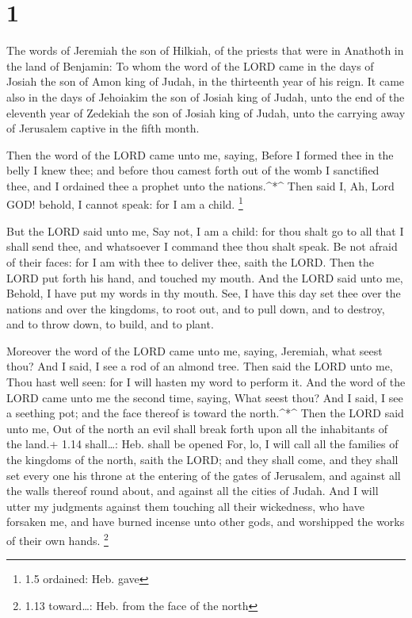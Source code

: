 \hypertarget{section}{%
\section{1}\label{section}}

 The words of Jeremiah the son of Hilkiah, of the priests
that were in Anathoth in the land of Benjamin:  To whom the
word of the LORD came in the days of Josiah the son of Amon king of
Judah, in the thirteenth year of his reign.  It came also in
the days of Jehoiakim the son of Josiah king of Judah, unto the end of
the eleventh year of Zedekiah the son of Josiah king of Judah, unto the
carrying away of Jerusalem captive in the fifth month.

 Then the word of the LORD came unto me, saying,
 Before I formed thee in the belly I knew thee; and before
thou camest forth out of the womb I sanctified thee, and I ordained thee
a prophet unto the nations.\^{}*\^{}  Then said I, Ah, Lord
GOD! behold, I cannot speak: for I am a child. \footnote{1.5 ordained:
  Heb. gave}

 But the LORD said unto me, Say not, I am a child: for thou
shalt go to all that I shall send thee, and whatsoever I command thee
thou shalt speak.  Be not afraid of their faces: for I am
with thee to deliver thee, saith the LORD.  Then the LORD
put forth his hand, and touched my mouth. And the LORD said unto me,
Behold, I have put my words in thy mouth.  See, I have this
day set thee over the nations and over the kingdoms, to root out, and to
pull down, and to destroy, and to throw down, to build, and to plant.

 Moreover the word of the LORD came unto me, saying,
Jeremiah, what seest thou? And I said, I see a rod of an almond tree.
 Then said the LORD unto me, Thou hast well seen: for I
will hasten my word to perform it.  And the word of the
LORD came unto me the second time, saying, What seest thou? And I said,
I see a seething pot; and the face thereof is toward the north.\^{}*\^{}
 Then the LORD said unto me, Out of the north an evil shall
break forth upon all the inhabitants of the land.+ 1.14 shall\ldots:
Heb. shall be opened  For, lo, I will call all the families
of the kingdoms of the north, saith the LORD; and they shall come, and
they shall set every one his throne at the entering of the gates of
Jerusalem, and against all the walls thereof round about, and against
all the cities of Judah.  And I will utter my judgments
against them touching all their wickedness, who have forsaken me, and
have burned incense unto other gods, and worshipped the works of their
own hands. \footnote{1.13 toward\ldots: Heb. from the face of the north}

